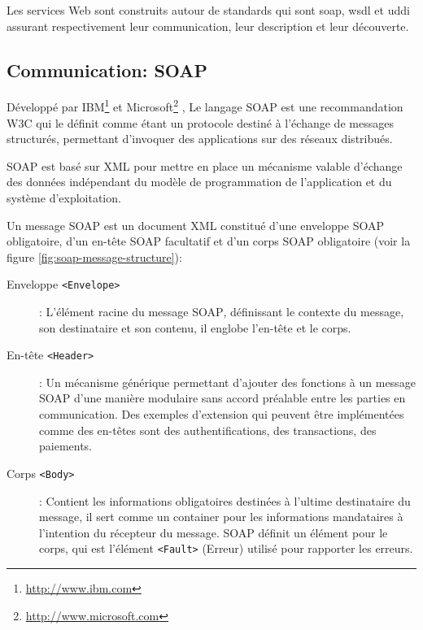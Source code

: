 Les services Web sont construits autour de standards qui sont
\acrshort{soap}, \acrshort{wsdl} et \acrshort{uddi} assurant
respectivement leur communication, leur description et leur
découverte.

  \subsection{Communication: SOAP}
  \label{sec:soap}
  Développé par IBM\footnote{\url{http://www.ibm.com}} et
  Microsoft\footnote{\url{http://www.microsoft.com}}
  \cite{box2000simple}, Le langage \textsc{SOAP} est une
  recommandation \textsc{W3C} \cite{mitra2003soap} qui le définit
  comme étant un protocole destiné à l'échange de messages structurés,
  permettant d'invoquer des applications sur des réseaux distribués.

  \textsc{SOAP} est basé sur \textsc{XML} pour mettre en place un
  mécanisme valable d'échange des données indépendant du modèle de
  programmation de l'application et du système d'exploitation.

  Un message \textsc{SOAP} est un document XML constitué d'une
  enveloppe \textsc{SOAP} obligatoire, d'un en-tête \textsc{SOAP}
  facultatif et d'un corps \textsc{SOAP} obligatoire (voir la figure
  \ref{fig:soap-message-structure}):

  

  \renewcommand{\descriptionlabel}[1]{\hspace{1cm}\textbullet~\textsf{#1}}
  \begin{description}
  \item[Enveloppe \texttt{<Envelope>}]: L'élément racine du message
    \textsc{SOAP}, définissant le contexte du message, son
    destinataire et son contenu, il englobe l'en-tête et le corps.

  \item[En-tête \texttt{<Header>}]: Un mécanisme générique permettant
    d'ajouter des fonctions à un message \textsc{SOAP} d'une manière
    modulaire sans accord préalable entre les parties en
    communication.  Des exemples d'extension qui peuvent être
    implémentées comme des en-têtes sont des authentifications, des
    transactions, des paiements.

  \item[Corps \texttt{<Body>}]: Contient les informations obligatoires
    destinées à l'ultime destinataire du message, il sert comme un
    container pour les informations mandataires à l'intention du
    récepteur du message. \textsc{SOAP} définit un élément pour le
    corps, qui est l'élément \texttt{<Fault>} (Erreur) utilisé pour
    rapporter les erreurs.
  \end{description}

